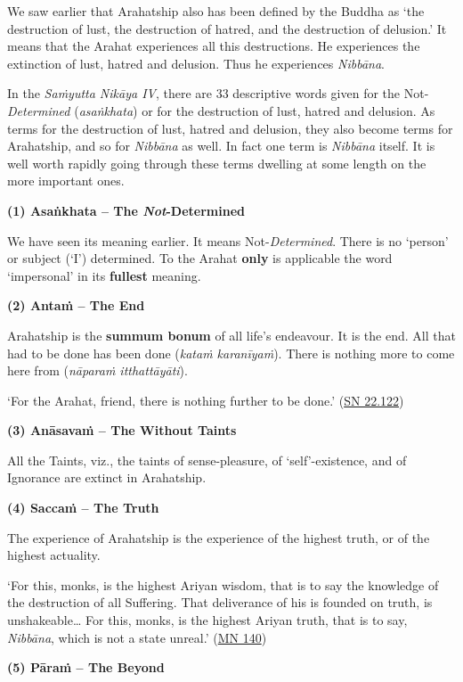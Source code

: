 We saw earlier that Arahatship also has been defined by the Buddha as `the destruction of lust, the destruction of hatred, and the destruction of delusion.' It means that the Arahat experiences all this destructions. He experiences the extinction of lust, hatred and delusion. Thus he experiences \emph{Nibbāna}.

In the \emph{Saṁyutta Nikāya IV}, there are 33 descriptive words given for the Not-\emph{Determined} (\emph{asaṅkhata}) or for the destruction of lust, hatred and delusion. As terms for the destruction of lust, hatred and delusion, they also become terms for Arahatship, and so for \emph{Nibbāna} as well. In fact one term is \emph{Nibbāna} itself. It is well worth rapidly going through these terms dwelling at some length on the more important ones.

\textbf{(1) Asaṅkhata -- The \emph{Not}-Determined}

We have seen its meaning earlier. It means Not-\emph{Determined}. There is no `person' or subject (`I') determined. To the Arahat \textbf{only} is applicable the word `impersonal' in its \textbf{fullest} meaning.

\textbf{(2) Antaṁ -- The End}

Arahatship is the \textbf{summum bonum} of all life's endeavour. It is the end. All that had to be done has been done (\emph{kataṁ karanīyaṁ}). There is nothing more to come here from (\emph{nāparaṁ itthattāyāti}).

`For the Arahat, friend, there is nothing further to be done.' (\href{https://suttacentral.net/sn22.122/en/suddhaso}{SN 22.122})

\textbf{(3) Anāsavaṁ -- The Without Taints}

All the Taints, viz., the taints of sense-pleasure, of `self'-existence, and of Ignorance are extinct in Arahatship.

\textbf{(4) Saccaṁ -- The Truth}

The experience of Arahatship is the experience of the highest truth, or of the highest actuality.

`For this, monks, is the highest Ariyan wisdom, that is to say the knowledge of the destruction of all Suffering. That deliverance of his is founded on truth, is unshakeable\ldots\hspace{0pt} For this, monks, is the highest Ariyan truth, that is to say, \emph{Nibbāna}, which is not a state unreal.' (\href{https://suttacentral.net/mn140/en/bodhi}{MN 140})

\textbf{(5) Pāraṁ -- The Beyond}

